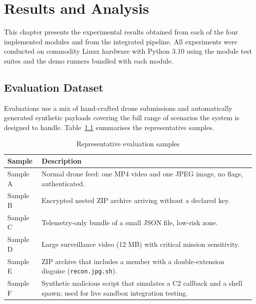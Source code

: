 \documentclass[12pt, a4paper]{report}
\begin{document}
\cleardoublepage


\chapter{Results and Analysis}
\label{chap:results}

This chapter presents the experimental results obtained from each of
the four implemented modules and from the integrated pipeline. All
experiments were conducted on commodity Linux hardware with Python
3.10 using the module test suites and the demo runners bundled with
each module.

\section{Evaluation Dataset}

Evaluations use a mix of hand-crafted drone submissions and
automatically generated synthetic payloads covering the full range of
scenarios the system is designed to handle.
Table~\ref{tab:dataset_samples} summarises the representative
samples.

\begin{table}[H]
\centering
\caption{Representative evaluation samples}
\label{tab:dataset_samples}
\begin{tabular}{|l|p{10cm}|}
\hline
\textbf{Sample} & \textbf{Description} \\
\hline
Sample A & Normal drone feed: one MP4 video and one JPEG image, no flags, authenticated. \\
\hline
Sample B & Encrypted nested ZIP archive arriving without a declared key. \\
\hline
Sample C & Telemetry-only bundle of a small JSON file, low-risk zone. \\
\hline
Sample D & Large surveillance video (12 MB) with critical mission sensitivity. \\
\hline
Sample E & ZIP archive that includes a member with a double-extension disguise (\texttt{recon.jpg.sh}). \\
\hline
Sample F & Synthetic malicious script that simulates a C2 callback and a shell spawn; used for live sandbox integration testing. \\
\hline
\end{tabular}
\end{table}
\end{document}
